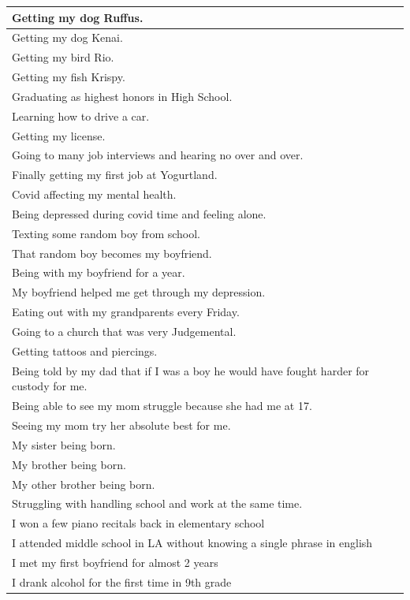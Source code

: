 \documentclass[
  .7em,
  letterpaper,
  DIV=11,
  numbers=noendperiod]{scrartcl}
\begin{document}
\begin{table}
\begin{tabular}{l}
Getting my dog Ruffus.\\
\hline
Getting my dog Kenai.\\
\hline
Getting my bird Rio.\\
\hline
Getting my fish Krispy.\\
\hline
Graduating as highest honors in High School.\\
\hline
Learning how to drive a car.\\
\hline
Getting my license.\\
\hline
Going to many job interviews and hearing no over and over.\\
\hline
Finally getting my first job at Yogurtland.\\
\hline
Covid affecting my mental health.\\
\hline
Being depressed during covid time and feeling alone.\\
\hline
Texting some random boy from school.\\
\hline
That random boy becomes my boyfriend.\\
\hline
Being with my boyfriend for a year.\\
\hline
My boyfriend helped me get through my depression.\\
\hline
Eating out with my grandparents every Friday.\\
\hline
Going to a church that was very Judgemental.\\
\hline
Getting tattoos and piercings.\\
\hline
Being told by my dad that if I was a boy he would have fought harder for custody for me.\\
\hline
Being able to see my mom struggle because she had me at 17.\\
\hline
Seeing my mom try her absolute best for me.\\
\hline
My sister being born.\\
\hline
My brother being born.\\
\hline
My other brother being born.\\
\hline
Struggling with handling school and work at the same time.\\
\hline
I won a few piano recitals back in elementary school\\
\hline
I attended middle school in LA without knowing a single phrase in english\\
\hline
I met my first boyfriend for almost 2 years\\
\hline
I drank alcohol for the first time in 9th grade\\

\end{tabular}
\end{table}
\end{document}
